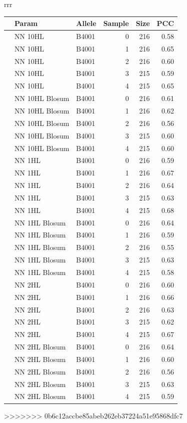 \documentclass[presentation]{beamer}   %
\begin{document}
\begin{frame}
\begin{table}[hb]
\begin{center}
\begin{tabular}{rrr}
\begin{tabular}{rllrrr}
  \hline
 & Param & Allele & Sample & Size & PCC \\ 
  \hline
   & NN 10HL & B4001 &   0 & 216 & 0.58 \\ 
   & NN 10HL & B4001 &   1 & 216 & 0.65 \\ 
   & NN 10HL & B4001 &   2 & 216 & 0.60 \\ 
   & NN 10HL & B4001 &   3 & 215 & 0.59 \\ 
   & NN 10HL & B4001 &   4 & 215 & 0.65 \\ 
\hline
   & NN 10HL Blosum & B4001 &   0 & 216 & 0.61 \\ 
   & NN 10HL Blosum & B4001 &   1 & 216 & 0.62 \\ 
   & NN 10HL Blosum & B4001 &   2 & 216 & 0.56 \\ 
   & NN 10HL Blosum & B4001 &   3 & 215 & 0.60 \\ 
   & NN 10HL Blosum & B4001 &   4 & 215 & 0.60 \\ 
\hline
   & NN 1HL & B4001 &   0 & 216 & 0.59 \\ 
   & NN 1HL & B4001 &   1 & 216 & 0.67 \\ 
   & NN 1HL & B4001 &   2 & 216 & 0.64 \\ 
   & NN 1HL & B4001 &   3 & 215 & 0.63 \\ 
   & NN 1HL & B4001 &   4 & 215 & 0.68 \\ 
\hline
   & NN 1HL Blosum & B4001 &   0 & 216 & 0.64 \\ 
   & NN 1HL Blosum & B4001 &   1 & 216 & 0.59 \\ 
   & NN 1HL Blosum & B4001 &   2 & 216 & 0.55 \\ 
   & NN 1HL Blosum & B4001 &   3 & 215 & 0.63 \\ 
   & NN 1HL Blosum & B4001 &   4 & 215 & 0.58 \\ 
\hline
   & NN 2HL & B4001 &   0 & 216 & 0.60 \\ 
   & NN 2HL & B4001 &   1 & 216 & 0.66 \\ 
   & NN 2HL & B4001 &   2 & 216 & 0.63 \\ 
   & NN 2HL & B4001 &   3 & 215 & 0.62 \\ 
   & NN 2HL & B4001 &   4 & 215 & 0.67 \\ 
\hline
   & NN 2HL Blosum & B4001 &   0 & 216 & 0.64 \\ 
   & NN 2HL Blosum & B4001 &   1 & 216 & 0.60 \\ 
   & NN 2HL Blosum & B4001 &   2 & 216 & 0.56 \\ 
   & NN 2HL Blosum & B4001 &   3 & 215 & 0.63 \\ 
   & NN 2HL Blosum & B4001 &   4 & 215 & 0.59 \\ 
   \hline
\end{tabular}
\end{tabular}
\end{center}

\end{table}


>>>>>>> 0b6c12accbe85abeb262eb37224a51e95868dfc7
\end{frame}
\end{document}
